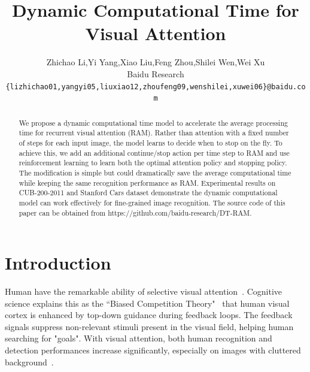 \documentclass[10pt,twocolumn,letterpaper]{article}
\begin{document}
\title{Dynamic Computational Time for Visual Attention}

\author{Zhichao Li,Yi Yang,Xiao Liu,Feng Zhou,Shilei Wen,Wei Xu\\
Baidu Research\\
{\tt\small \{lizhichao01,yangyi05,liuxiao12,zhoufeng09,wenshilei,xuwei06\}@baidu.com}
}
\maketitle


\begin{abstract}
We propose a dynamic computational time model to accelerate the average processing time for recurrent visual attention (RAM).
Rather than attention with a fixed number of steps for each input image, the model learns to decide when to stop on the fly.
To achieve this, we add an additional continue/stop action per time step to RAM and use reinforcement learning to learn both the optimal attention policy and stopping policy.
The modification is simple but could dramatically save the average computational time while keeping the same recognition performance as RAM.
Experimental results on CUB-200-2011 and Stanford Cars dataset demonstrate the dynamic computational model can work effectively for fine-grained image recognition.
The source code of this paper can be obtained from {\color{blue} https://github.com/baidu-research/DT-RAM}.
\end{abstract}

\section{Introduction}


Human have the remarkable ability of selective visual attention~\cite{hayhoe2005eye, desimone1995neural}.
Cognitive science explains this as the ``Biased Competition Theory"~\cite{beck2009top, desimone1998visual} that human visual cortex is enhanced by top-down guidance during feedback loops.
The feedback signals suppress non-relevant stimuli present in the visual field, helping human searching for "goals".
With visual attention, both human recognition and detection performances increase significantly, especially on images with cluttered background~\cite{cichy2014resolving}.
\end{document}
